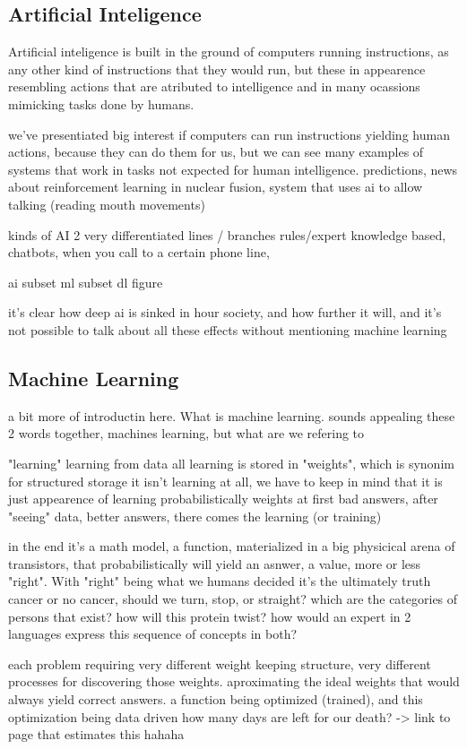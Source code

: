 \documentclass[11pt,english,listoffigures,listoftables]{tfgetsinf}
\begin{document}
\subsection{Artificial Inteligence}
Artificial inteligence is built in the ground of computers running instructions, as any other kind of instructions that they would run, but these in appearence resembling actions that are atributed to intelligence and in many ocassions mimicking tasks done by humans.

we've presentiated big interest if computers can run instructions yielding human actions, because they can do them for us, but we can see many examples of systems that work in tasks not expected for human intelligence. predictions, news about reinforcement learning in nuclear fusion, system that uses ai to allow talking (reading mouth movements)

kinds of AI 
2 very differentiated lines / branches
rules/expert knowledge based, chatbots, when you call to a certain phone line, 

ai subset ml subset dl figure

it's clear how deep ai is sinked in hour society, and how further it will, and it's not possible to talk about all these effects without mentioning machine learning 

\subsection{Machine Learning}
a bit more of introductin here. What is machine learning. sounds appealing these 2 words together, machines learning, but what are we refering to

"learning"
learning from data
all learning is stored in "weights", which is synonim for structured storage
it isn't learning at all, we have to keep in mind that it is just appearence of learning
probabilistically
weights at first bad answers, after "seeing" data, better answers, there comes the learning (or training)

in the end it's a math model, a function, materialized in a big physicical arena of transistors, that probabilistically will yield an asnwer, a value, more or less "right". With "right" being what we humans decided it's the ultimately truth
cancer or no cancer, should we turn, stop, or straight?
which are the categories of persons that exist? how will this protein twist? how would an expert in 2 languages express this sequence of concepts in both? 

each problem requiring very different weight keeping structure, very different processes for discovering those weights. aproximating the ideal weights that would always yield correct answers.
a function being optimized (trained), and this optimization being data driven
how many days are left for our death? -> link to page that estimates this hahaha
\end{document}

